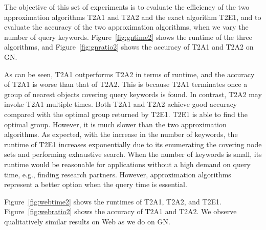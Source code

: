 \documentclass{sig-alternate}
\begin{document}
%
The objective of this set of experiments is to evaluate the efficiency of
the two approximation algorithms T2A1 and T2A2 and the exact algorithm
T2E1, and to evaluate the accuracy of the two approximation algorithms, when we
vary the number of query keywords.
%
Figure~\ref{fig:gntime2} shows the runtime of the three algorithms,
and Figure~\ref{fig:gnratio2} shows the accuracy of T2A1 and T2A2 on
\textsf{GN}.

As can be seen, T2A1 outperforms T2A2 in terms of
runtime, and the accuracy of T2A1 is worse than that of T2A2.
%
This is because T2A1 terminates once a group of nearest objects
covering query keywords is found. In contrast, T2A2 may invoke T2A1
multiple times. Both T2A1 and T2A2 achieve good accuracy compared with the
optimal group returned by T2E1.
%
T2E1 is able to find the optimal group. However, it is much slower
than the two approximation algorithms. As expected, with the
increase in the number of keywords, the runtime of T2E1 increases
exponentially due to its enumerating the covering node sets and
performing exhaustive search.
%
When the number of keywords is small, its runtime would be
reasonable for applications without a high demand on query time,
e.g., finding research partners. However, approximation algorithms represent
a better option when the query time is essential.


 Figure~\ref{fig:webtime2} shows
the runtimes of T2A1, T2A2, and T2E1. Figure~\ref{fig:webratio2}
shows the accuracy of T2A1 and T2A2. We observe qualitatively
similar results on \textsf{Web} as we do on \textsf{GN}.
\end{document}
